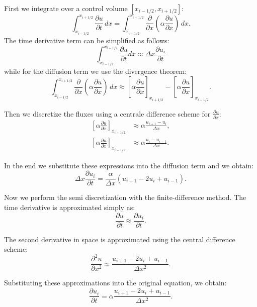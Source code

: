 \documentclass{article}
\begin{document}
First we integrate over a control volume $\left[x_{i-1/2}, x_{i+1/2}\right]$:
\begin{equation}
  \int_{x_{i-1/2}}^{x_{i+1/2}} \frac{\partial u}{\partial t} \, dx = \int_{x_{i-1/2}}^{x_{i+1/2}} \frac{\partial}{\partial x} \left( \alpha \frac{\partial u}{\partial x} \right) \, dx.
\end{equation}
The time derivative term can be simplified as follows:
\[
\int_{x_{i-1/2}}^{x_{i+1/2}} \frac{\partial u}{\partial t} dx \approx \Delta x \frac{\partial u_i}{\partial t}
\]
while for the diffusion term we use the divergence theorem:
\[
  \int_{x_{i-1/2}}^{x_{i+1/2}} \frac{\partial}{\partial x} \left( \alpha \frac{\partial u}{\partial x} \right) \, dx \approx \left[ \alpha \frac{\partial u}{\partial x} \right]_{x_{i+1/2}} - \left[ \alpha \frac{\partial u}{\partial x} \right]_{x_{i-1/2}}.
\]

Then we discretize the fluxes using a centrale difference scheme for $\frac{\partial u}{\partial x}$:
\begin{align}
  \left[ \alpha \frac{\partial u}{\partial x} \right]_{x_{i+1/2}} &\approx \alpha \frac{u_{i+1} - u_i}{\Delta x}, \\
  \left[ \alpha \frac{\partial u}{\partial x} \right]_{x_{i-1/2}} &\approx \alpha \frac{u_i - u_{i-1}}{\Delta x}.
\end{align}

In the end we substitute these expressions into the diffusion term and we obtain:
\begin{equation} \label{FVM}
  \Delta x \frac{\partial u_i}{\partial t} = \frac{\alpha}{\Delta x} \left( u_{i+1} - 2u_i + u_{i-1} \right).
\end{equation}

Now we perform the semi discretization with the finite-difference method.
The time derivative is approximated simply as:
\begin{equation}
  \frac{\partial u}{\partial t} \approx \frac{\partial u_i}{\partial t}.
\end{equation}

The second derivative in space is approximated using the central difference scheme:
\begin{equation}
  \frac{\partial^2 u}{\partial x^2} \approx \frac{u_{i+1} - 2u_i + u_{i-1}}{\Delta x^2}.
\end{equation}

Substituting these approximations into the original equation, we obtain:
\begin{equation}
  \frac{\partial u_i}{\partial t} = \alpha \frac{u_{i+1} - 2u_i + u_{i-1}}{\Delta x^2}.
\end{equation}
\end{document}
